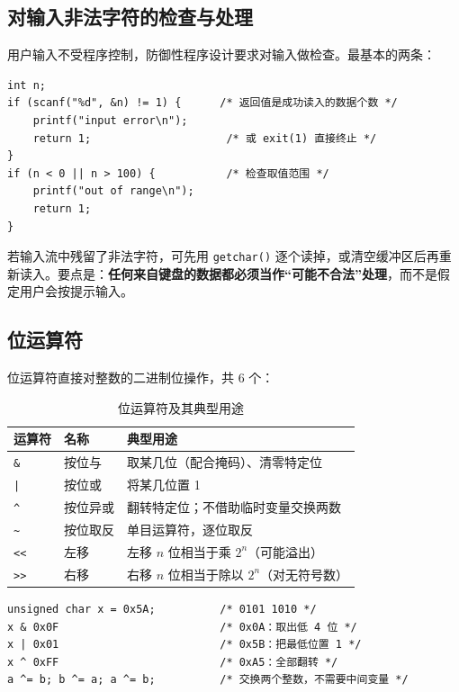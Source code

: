 \subsection{对输入非法字符的检查与处理}

用户输入不受程序控制，防御性程序设计要求对输入做检查。最基本的两条：

\begin{lstlisting}
int n;
if (scanf("%d", &n) != 1) {      /* 返回值是成功读入的数据个数 */
    printf("input error\n");
    return 1;                     /* 或 exit(1) 直接终止 */
}
if (n < 0 || n > 100) {           /* 检查取值范围 */
    printf("out of range\n");
    return 1;
}
\end{lstlisting}

若输入流中残留了非法字符，可先用 \texttt{getchar()} 逐个读掉，或清空缓冲区后再重新读入。要点是：\textbf{任何来自键盘的数据都必须当作“可能不合法”处理}，而不是假定用户会按提示输入。

\subsection{位运算符}

位运算符直接对整数的二进制位操作，共 6 个：

\begin{table}[htbp]
\centering
\caption{位运算符及其典型用途}
\small
\begin{tabularx}{\textwidth}{@{}llX@{}}
\toprule
运算符 & 名称 & 典型用途 \\
\midrule
\texttt{\&} & 按位与 & 取某几位（配合掩码）、清零特定位 \\
\texttt{|} & 按位或 & 将某几位置 1 \\
\texttt{\^{}} & 按位异或 & 翻转特定位；不借助临时变量交换两数 \\
\texttt{\textasciitilde} & 按位取反 & 单目运算符，逐位取反 \\
\texttt{<<} & 左移 & 左移 $n$ 位相当于乘 $2^{n}$（可能溢出） \\
\texttt{>>} & 右移 & 右移 $n$ 位相当于除以 $2^{n}$（对无符号数） \\
\bottomrule
\end{tabularx}
\end{table}

\begin{lstlisting}
unsigned char x = 0x5A;          /* 0101 1010 */
x & 0x0F                         /* 0x0A：取出低 4 位 */
x | 0x01                         /* 0x5B：把最低位置 1 */
x ^ 0xFF                         /* 0xA5：全部翻转 */
a ^= b; b ^= a; a ^= b;          /* 交换两个整数，不需要中间变量 */
\end{lstlisting}

